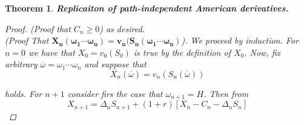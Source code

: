 \documentclass[12pt]{article}
\newtheorem{theorem}{Theorem}
\begin{document}
\begin{theorem}{\bf Replicaiton of path-independent American derivatives.}
\begin{proof} {(\em Proof that $C_n \geq 0$)}
as desired. \\

{(\em Proof That $\bm{X_n(\omega_1\cdots\omega_n) = v_n(S_n(\omega_1\cdots\omega_n)}$)}. We proceed by induction. For $n = 0$ we have that $X_0 = v_0(S_0)$ is true by the definition of $X_0$. Now, fix arbitrary $\overline{\omega} = \omega_1\cdots\omega_n$ and suppose that
\begin{equation*}
	X_n(\overline{\omega}) = v_n(S_n(\overline{\omega}))
\end{equation*}

holds. For $n + 1$ consider firs the case that $\omega_{n + 1} = H$. Then from
\begin{equation*}
	X_{n + 1} = \Delta_nS_{n + 1} + (1 + r)[X_n - C_n - \Delta_nS_n]
\end{equation*}


\end{proof}
\end{theorem}
\end{document}
